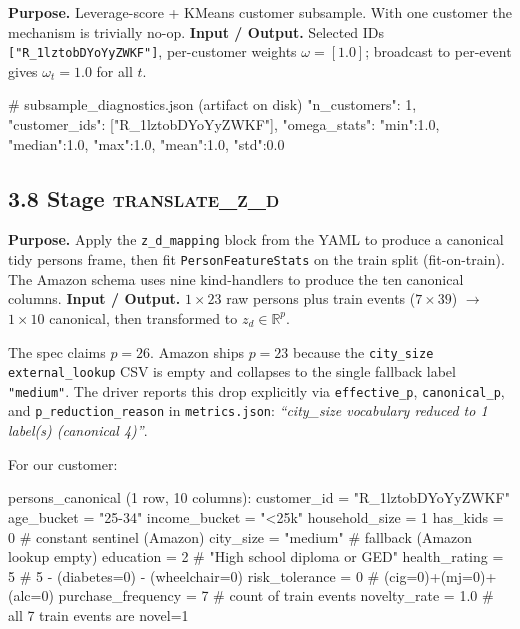 \documentclass[11pt,a4paper]{article}
\begin{document}
\textbf{Purpose.} Leverage-score + KMeans customer subsample. With one
customer the mechanism is trivially no-op.
\textbf{Input / Output.} Selected IDs
\verb|["R_1lztobDYoYyZWKF"]|, per-customer weights
$\omega = [1.0]$; broadcast to per-event gives
$\omega_t = 1.0$ for all $t$.

\begin{code}
# subsample_diagnostics.json  (artifact on disk)
{
 "n_customers": 1,
 "customer_ids": ["R_1lztobDYoYyZWKF"],
 "omega_stats": {"min":1.0, "median":1.0, "max":1.0,
                 "mean":1.0, "std":0.0}
}
\end{code}

\subsection*{3.8 Stage \textsc{translate\_z\_d}}

\textbf{Purpose.} Apply the \texttt{z\_d\_mapping} block from the YAML
to produce a canonical tidy persons frame, then fit
\texttt{PersonFeatureStats} on the train split (fit-on-train). The
Amazon schema uses nine kind-handlers to produce the ten canonical
columns.
\textbf{Input / Output.} $1 \times 23$ raw persons plus train events
($7 \times 39$) $\to$ $1 \times 10$ canonical, then transformed to
$z_d \in \mathbb{R}^{p}$.

The spec claims $p = 26$. Amazon ships $p = 23$ because the
\texttt{city\_size} \texttt{external\_lookup} CSV is empty and
collapses to the single fallback label \texttt{"medium"}. The driver
reports this drop explicitly via \texttt{effective\_p},
\texttt{canonical\_p}, and \texttt{p\_reduction\_reason} in
\texttt{metrics.json}: \emph{``city\_size vocabulary reduced to 1
label(s) (canonical 4)''}.

For our customer:
\begin{code}
persons_canonical (1 row, 10 columns):
  customer_id         = "R_1lztobDYoYyZWKF"
  age_bucket          = "25-34"
  income_bucket       = "<25k"
  household_size      = 1
  has_kids            = 0          # constant sentinel (Amazon)
  city_size           = "medium"   # fallback (Amazon lookup empty)
  education           = 2          # "High school diploma or GED"
  health_rating       = 5          # 5 - (diabetes=0) - (wheelchair=0)
  risk_tolerance      = 0          # (cig=0)+(mj=0)+(alc=0)
  purchase_frequency  = 7          # count of train events
  novelty_rate        = 1.0        # all 7 train events are novel=1
\end{code}
\end{document}
